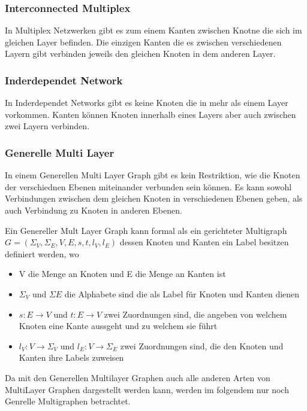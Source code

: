 \subsubsection{Interconnected Multiplex}

In Multiplex Netzwerken gibt es zum einem Kanten zwischen Knotne die sich im gleichen Layer befinden. Die einzigen Kanten die es zwischen verschiedenen Layern gibt verbinden jeweils den gleichen Knoten in dem anderen Layer. 

\subsubsection{Inderdependet Network}

In Inderdependet Networks gibt es keine Knoten die in mehr als einem Layer vorkommen. Kanten können Knoten innerhalb eines Layers aber auch zwischen zwei Layern verbinden.

\subsubsection{Generelle Multi Layer}
In einem Generellen Multi Layer Graph gibt es kein Restriktion, wie die Knoten der verschiednen Ebenen miteinander verbunden sein können. Es kann sowohl Verbindungen zwischen dem gleichen Knoten in verschiedenen Ebenen geben, als auch Verbindung zu Knoten in anderen Ebenen.


Ein Genereller Mult Layer Graph kann formal als ein gerichteter Multigraph $G = (\Sigma_{V}, \Sigma_{E}, V, E, s, t, l_{V}, l_{E})$ dessen Knoten und Kanten ein Label besitzen  definiert werden, wo

\begin{itemize}
  \item V die Menge an Knoten und E die Menge an Kanten ist
  \item $\Sigma_{V}$ und $\Sigma{E}$ die Alphabete sind die als Label für Knoten und Kanten dienen
  \item $s: E \rightarrow V$ und $t: E \rightarrow V$ zwei Zuordnungen sind, die angeben von welchem Knoten eine Kante aussgeht und zu welchem sie führt
  \item $l_{V}: V \rightarrow \Sigma_{V}$ und $l_{E}: V \rightarrow \Sigma_{E}$ zwei Zuordnungen sind, die den Knoten und Kanten ihre Labels zuweisen
\end{itemize}

Da mit den Generellen Multilayer Graphen auch alle anderen Arten von MultiLayer Graphen dargestellt werden kann, werden im folgendem nur noch Genrelle Multigraphen betrachtet.
